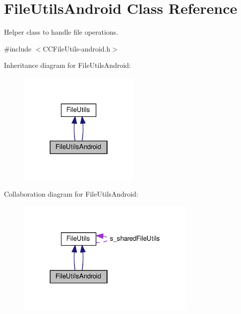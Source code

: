 \hypertarget{classFileUtilsAndroid}{}\section{File\+Utils\+Android Class Reference}
\label{classFileUtilsAndroid}


Helper class to handle file operations.  




{\ttfamily \#include $<$C\+C\+File\+Utils-\/android.\+h$>$}



Inheritance diagram for File\+Utils\+Android\+:
\nopagebreak
\begin{figure}[H]
\begin{center}
\leavevmode
\includegraphics[width=166pt]{classFileUtilsAndroid__inherit__graph}
\end{center}
\end{figure}


Collaboration diagram for File\+Utils\+Android\+:
\nopagebreak
\begin{figure}[H]
\begin{center}
\leavevmode
\includegraphics[width=247pt]{classFileUtilsAndroid__coll__graph}
\end{center}
\end{figure}
